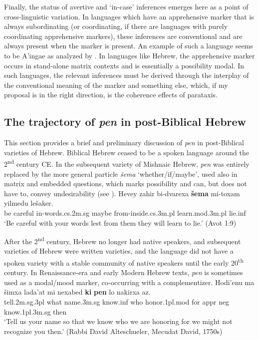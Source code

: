 \documentclass[output=paper,colorlinks,citecolor=brown]{langscibook}
\begin{document}
Finally, the status of avertive and `in-case' inferences emerges here as a point of cross-linguistic variation. In languages which have an apprehensive marker that is always subordinating (or coordinating, if there are languages with purely coordinating apprehensive markers), these inferences are conventional and are always present when the marker is present. An example of such a language seems to be A'ingae as analyzed by \citet{anderbois21}. In languages like Hebrew, the apprehensive marker occurs in stand-alone matrix contexts and is essentially a possibility modal. In such languages, the relevant inferences must be derived through the interplay of the conventional meaning of the marker and something else, which, if my proposal is in the right direction, is the coherence effects of parataxis.  
 

\subsection{The trajectory of \textit{pen} in post-Biblical Hebrew}
\label{subsec:trajectory}
This section provides a brief and preliminary discussion of \textit{pen} in post-Biblical varieties of Hebrew. Biblical Hebrew ceased to be a spoken language around the 2\textsuperscript{nd} century CE. In the subsequent variety of Mishnaic Hebrew, \textit{pen} was entirely replaced by the more general particle \textit{šema} `whether/if/maybe', used also in matrix and embedded questions, which marks possibility and can, but does not have to, convey undesirability (see \citealt{segal01}).
\ea
\gll Hevey zahir bi-dvarexa \textbf{šema} mi-toxam yilmedu lešaker. \\
be careful in-words.{\sc cs.2m.sg} maybe from-inside.{\sc cs.3m.pl} learn.{\sc mod.3m.pl} lie.{\sc inf} \\
\glt `Be careful with your words lest from them they will learn to lie.' (Avot 1:9)  
\z

After the 2\textsuperscript{nd} century, Hebrew no longer had native speakers, and subsequent varieties of Hebrew were written varieties, and the language did not have a spoken variety with a stable community of native speakers until the early 20\textsuperscript{th} century. In Renaissance-era and early Modern Hebrew texts, \textit{pen} is sometimes used as a modal/mood marker, co-occurring with a complementizer.
\ea
\gll Hodi'enu ma šimxa lada'at mi nexabed \textbf{ki} \textbf{pen} lo nakirxa az. \\
 tell.{\sc 2m.sg.3pl} what name.{\sc 3m.sg} know.{\sc inf}  who honor.{\sc 1pl.mod} for {\sc appr} {\sc neg} know.{\sc 1pl.3m.sg} then\\
\glt `Tell us your name so that we know who we are honoring for we might not recognize you then.' (Rabbi David Alteschueler, Mecudat David,  1750s)
\z
\end{document}
